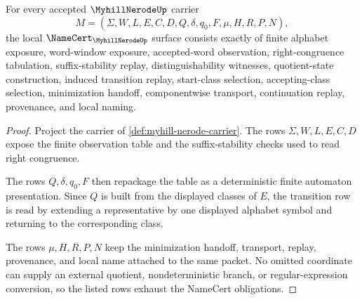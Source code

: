 \begin{theorem}
\label{thm:myhill-nerode-namecert-obligations}
For every accepted $\MyhillNerodeUp$ carrier
$$
M=(\Sigma,W,L,E,C,D,Q,\delta,q_0,F,\mu,H,R,P,N),
$$
the local $\NameCert_{\MyhillNerodeUp}$ surface consists exactly of finite alphabet exposure, word-window exposure, accepted-word observation, right-congruence tabulation, suffix-stability replay, distinguishability witnesses, quotient-state construction, induced transition replay, start-class selection, accepting-class selection, minimization handoff, componentwise transport, continuation replay, provenance, and local naming.
\end{theorem}
\begin{proof}
Project the carrier of \autoref{def:myhill-nerode-carrier}. The rows $\Sigma,W,L,E,C,D$ expose the finite observation table and the suffix-stability checks used to read right congruence.

The rows $Q,\delta,q_0,F$ then repackage the table as a deterministic finite automaton presentation. Since $Q$ is built from the displayed classes of $E$, the transition row is read by extending a representative by one displayed alphabet symbol and returning to the corresponding class.

The rows $\mu,H,R,P,N$ keep the minimization handoff, transport, replay, provenance, and local name attached to the same packet. No omitted coordinate can supply an external quotient, nondeterministic branch, or regular-expression conversion, so the listed rows exhaust the NameCert obligations.
\end{proof}

